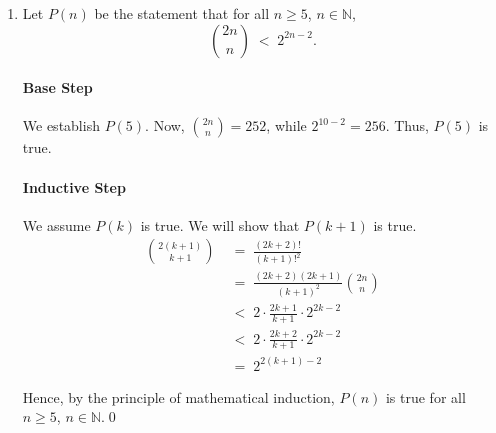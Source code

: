 \documentclass[10pt]{article}
\begin{document}
\begin{enumerate}
                Hence, by the principle of mathematical induction, $P(n)$ is true for all $n \in \mathbb{N}$.\qed\\

                \item Let $P(n)$ be the statement that for all $n \geq 5$, $n \in \mathbb{N}$,
                \[\binom{2n}{n} \;<\; 2^{2n - 2}.\]
                \paragraph{Base Step}
                We establish $P(5)$. Now, $\binom{2n}{n} = 252$, while $2^{10 - 2} = 256$. Thus, $P(5)$ is true.
                \paragraph{Inductive Step}
                We assume $P(k)$ is true. We will show that $P(k + 1)$ is true.
                \begin{align*}
                \binom{2(k + 1)}{k + 1} \;&=\; \frac{(2k + 2)!}{(k + 1)!^2} \\
                        \;&=\; \frac{(2k + 2)(2k + 1)}{(k + 1)^2} \binom{2n}{n} \\
                        \;&<\; 2\cdot \frac{2k + 1}{k + 1} \cdot 2^{2k - 2} \\
                        \;&<\; 2\cdot \frac{2k + 2}{k + 1} \cdot 2^{2k - 2} \\
                        \;&=\; 2^{2(k + 1) - 2}
                \end{align*}
                
                Hence, by the principle of mathematical induction, $P(n)$ is true for all $n \geq 5$, $n \in \mathbb{N}$.\qed\\
        \end{enumerate}
        
\end{document}
